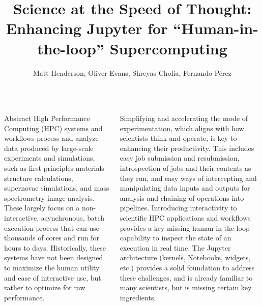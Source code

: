 \documentclass{tikzposter}
\author{Matt Henderson, Oliver Evans, Shreyas Cholia, Fernando P\'{e}rez}
\title{Science at the Speed of Thought: Enhancing Jupyter for ``Human-in-the-loop'' Supercomputing}
\institute{Lawrence Berkeley National Laboratory}
\begin{document}
\maketitle

\begin{columns}

 {
Abstract
     High Performance Computing (HPC) systems and workflows process and analyze data produced by large-scale experiments and simulations, such as first-principles materials structure calculations, supernovae simulations, and mass spectrometry image analysis. 
 These largely focus on a non-interactive, asynchronous, batch execution process that can use thousands of cores and run for hours to days. 
 Historically, these systems have not been designed to maximize the human utility and ease of interactive use, but rather to optimize for raw performance. 

     Simplifying and accelerating the mode of experimentation, which aligns with how scientists think and operate, is key to enhancing their productivity. 
 This includes easy job submission and resubmission, introspection of jobs and their contents as they run, and easy ways of intercepting and manipulating data inputs and outputs for analysis and chaining of operations into pipelines. 
 Introducing interactivity to scientific HPC applications and workflows provides a key missing human-in-the-loop capability to inspect the state of an execution in real time. 
 The Jupyter architecture (kernels, Notebooks, widgets, etc.) provides a solid foundation to address these challenges, and is already familiar to many scientists, but is missing certain key ingredients. 
}


\end{columns}
\end{document}
